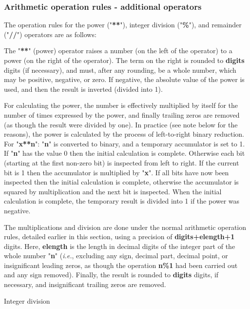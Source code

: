 \subsubsection{Arithmetic operation rules - additional operators}
 The operation rules for the power ("\textbf{**}"),
integer division ("\textbf{\%}"), and remainder
("\textbf{//}") operators are as follows:
\begin{description}
\item[Power]\label{refpower}

\index{,}
The "\textbf{**}" (power) operator raises a number (on the
left of the operator) to a power (on the right of the operator).
The term on the right is rounded to \textbf{digits} digits (if
necessary), and must, after any rounding, be a whole number, which may
be positive, negative, or zero.
If negative, the absolute value of the power is used, and then the
result is inverted (divided into 1).
 
For calculating the power, the number is effectively multiplied by
itself for the number of times expressed by the power, and finally
trailing zeros are removed (as though the result were divided by one).
 In practice (see note below for the reasons), the power is
calculated by the process of left-to-right binary reduction.
For "\textbf{x**n}": "\textbf{n}" is converted to
binary, and a temporary accumulator is set to 1.
If "\textbf{n}" has the value 0 then the initial calculation is
complete.
Otherwise each bit (starting at the first non-zero bit) is inspected
from left to right.
If the current bit is 1 then the accumulator is multiplied by
"\textbf{x}".
If all bits have now been inspected then the initial calculation is
complete, otherwise the accumulator is squared by multiplication and the
next bit is inspected.
When the initial calculation is complete, the temporary result is
divided into 1 if the power was negative.
 
The multiplications and division are done under the normal
arithmetic operation rules, detailed earlier in this section, using a
precision of \textbf{digits+elength+1} digits.
Here, \textbf{elength} is the length in decimal digits of the integer
part of the whole number "\textbf{n}" (\emph{i.e.}, excluding any sign,
decimal part, decimal point, or insignificant leading zeros, as though
the operation \textbf{n\%1} had been carried out and any sign removed).
Finally, the result is rounded to \textbf{digits} digits, if
necessary, and insignificant trailing zeros are removed.
\item{Integer division}


\end{description}
